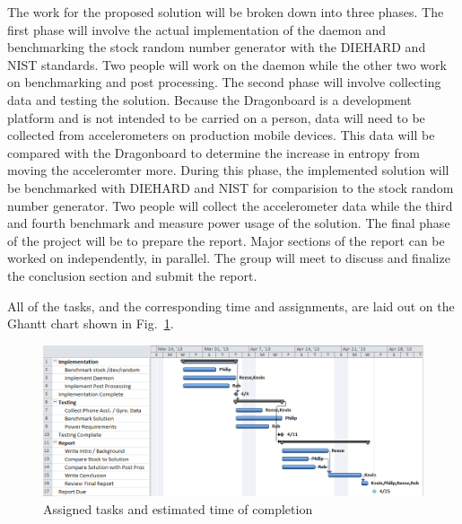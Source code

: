 
The work for the proposed solution will be broken down into three phases.  The first phase will involve the actual implementation of the daemon and benchmarking the stock random number generator with the DIEHARD and NIST standards.  Two people will work on the daemon while the other two work on benchmarking and post processing.  The second phase will involve collecting data and testing the solution.  Because the Dragonboard is a development platform and is not intended to be carried on a person, data will need to be collected from accelerometers on production mobile devices.  This data will be compared with the Dragonboard to determine the increase in entropy from moving the acceleromter more.  During this phase, the implemented solution will be benchmarked with DIEHARD and NIST for comparision to the stock random number generator.  Two people will collect the accelerometer data while the third and fourth benchmark and measure power usage of the solution.  The final phase of the project will be to prepare the report.  Major sections of the report can be worked on independently, in parallel.  The group will meet to discuss and finalize the conclusion section and submit the report.  

All of the tasks, and the corresponding time and assignments, are laid out on the Ghantt chart shown in Fig.~\ref{fig:gahntt}.

\begin{figure}[t]
    \centering
    \includegraphics[scale=0.71]{proj-ghantt-v3}
    \caption{Assigned tasks and estimated time of completion}
    \label{fig:gahntt}
\end{figure}
